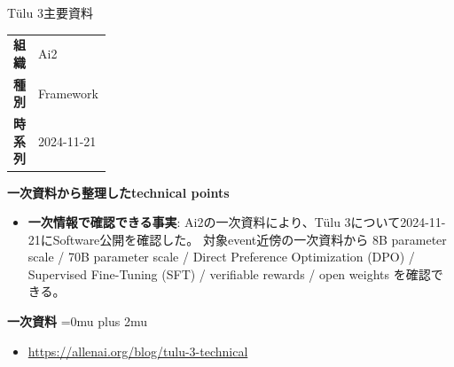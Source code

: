 \begin{technicalnote}{Tülu 3}{主要資料}
\begingroup
\begin{tabularx}{\linewidth}{@{}>{\bfseries}p{0.22\linewidth}X@{}}
組織 & Ai2 \\
種別 & Framework \\
時系列 & 2024-11-21 \\
\end{tabularx}
\smallskip
{\bfseries 一次資料から整理したtechnical points}
\begin{itemize}[leftmargin=1.5em,itemsep=0.35em]
\item \textbf{一次情報で確認できる事実}: Ai2の一次資料により、Tülu 3について2024-11-21にSoftware公開を確認した。 対象event近傍の一次資料から 8B parameter scale / 70B parameter scale / Direct Preference Optimization (DPO) / Supervised Fine-Tuning (SFT) / verifiable rewards / open weights を確認できる。
\end{itemize}
\begin{minipage}{\linewidth}
\begin{samepage}
{\bfseries 一次資料}
\begingroup\sloppy
\Urlmuskip=0mu plus 2mu\relax
\begin{itemize}[leftmargin=1.5em,itemsep=0.25em]
\item {\scriptsize\url{https://allenai.org/blog/tulu-3-technical}}
\end{itemize}
\endgroup
\end{samepage}
\end{minipage}
\endgroup
\end{technicalnote}
\medskip

